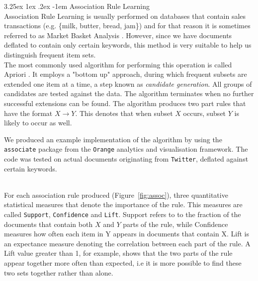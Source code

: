 \documentclass[12pt]{article}
\makeatletter
\renewcommand\paragraph{\@startsection{paragraph}{5}{\z@}%
  {3.25ex \@plus1ex \@minus.2ex}%
  {-1em}%
  {\normalfont\normalsize\bfseries}}
\makeatother
\begin{document}
\paragraph{Association Rule Learning}
\hfill \break 
\\
Association Rule Learning is usually performed on databases that contain sales transactions (e.g. \{milk, butter, bread, jam\}) and for that reason it is sometimes referred to as Market Basket Analysis \cite{assoc1}. However, since we have documents deflated to contain only certain keywords, this method is very suitable to help us distinguish frequent item sets. 
\hfill \break 
\\
The most commonly used algorithm for performing this operation is called Apriori \cite{assoc2}. It  employs a "bottom up" approach, during which frequent subsets are extended one item at a time, a step known as \textit{candidate generation}. All groups of candidates are tested against the data. The algorithm terminates when no further successful extensions can be found. The algorithm produces two part rules that have the format $X \rightarrow Y$. This denotes that when subset $X$ occurs, subset $Y$ is likely to occur as well.  \hfill \break 
\\
\parbox{\linewidth}{
We produced an example implementation of the algorithm by using the \texttt{associate}\cite{orange-assoc} package from the \texttt{Orange}\cite{orange} analytics and visualisation framework. The code was tested on actual documents originating from \texttt{Twitter}, deflated against certain keywords. 
}
 \hfill \break \\
For each association rule produced (Figure~\ref{fig:assoc}), three quantitative statistical measures that denote the importance of the rule. This measures are called \texttt{Support}, \texttt{Confidence} and \texttt{Lift}. Support refers to to the fraction of the documents that contain both $X$ and $Y$ parts of the rule, while Confidence measures how often each item in Y appears in documents that contain X. Lift is an expectance measure denoting the correlation between each part of the rule. A Lift value greater than 1, for example, shows that the two parts of the rule appear together more often than expected, i.e it is more possible to find these two sets together rather than alone. 
\hfill \break 
\newpage
\end{document}
